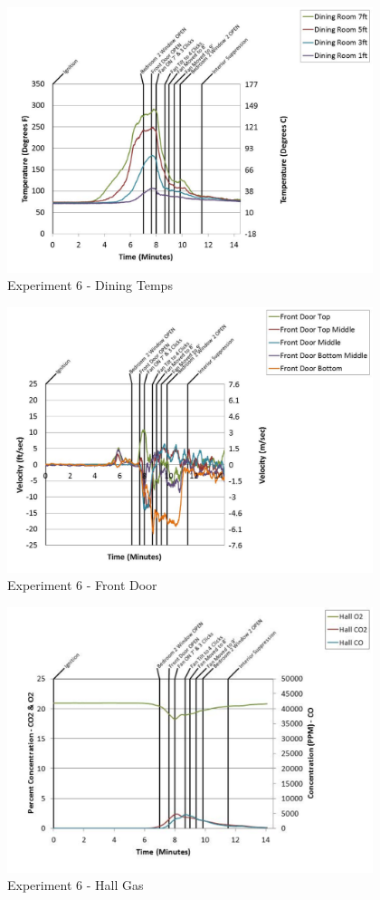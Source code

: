 \documentclass{article}
\begin{document}
\begin{appendices}
	\begin{figure}[h!]
		\centering
		\includegraphics[height=3.05in]{0_Images/Results_Charts/Exp_6_Charts/DiningTemps.pdf}
		\caption{Experiment 6 - Dining Temps}
	\end{figure}
 
	\clearpage

	\begin{figure}[h!]
		\centering
		\includegraphics[height=3.05in]{0_Images/Results_Charts/Exp_6_Charts/FrontDoor.pdf}
		\caption{Experiment 6 - Front Door}
	\end{figure}
 

	\begin{figure}[h!]
		\centering
		\includegraphics[height=3.05in]{0_Images/Results_Charts/Exp_6_Charts/HallGas.pdf}
		\caption{Experiment 6 - Hall Gas}
	\end{figure}
 

\end{appendices}
\end{document}
